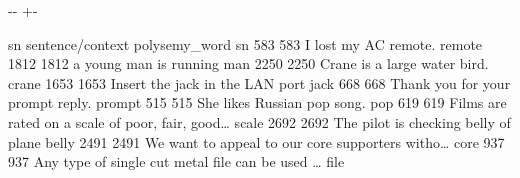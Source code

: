 \documentclass[letterpaper,10pt,english]{sphinxmanual}
\newlength\nbsphinxcodecellspacing
\begin{document}
{
\begin{sphinxVerbatim}[commandchars=\\\{\}]
\llap{\color{nbsphinxin}[6]:\,\hspace{\fboxrule}\hspace{\fboxsep}}  

  

  

 
\end{sphinxVerbatim}
}

{

\kern-\sphinxverbatimsmallskipamount\kern-\baselineskip
\kern+\FrameHeightAdjust\kern-\fboxrule
\vspace{\nbsphinxcodecellspacing}

\begin{sphinxVerbatim}[commandchars=\\\{\}]
\llap{\color{nbsphinxout}[6]:\,\hspace{\fboxrule}\hspace{\fboxsep}}        sn                                   sentence/context polysemy\_word
sn
583    583                               I lost my AC remote.        remote
1812  1812                             a young man is running           man
2250  2250                       Crane is a large water bird.         crane
1653  1653                    Insert the jack in the LAN port          jack
668    668                   Thank you for your prompt reply.        prompt
515    515                        She likes Russian pop song.           pop
619    619  Films are rated on a scale of poor, fair, good{\ldots}         scale
2692  2692               The pilot is checking belly of plane         belly
2491  2491  We want to appeal to our core supporters witho{\ldots}          core
937    937  Any type of single cut metal file can be used {\ldots}          file
\end{sphinxVerbatim}
}
\end{document}
